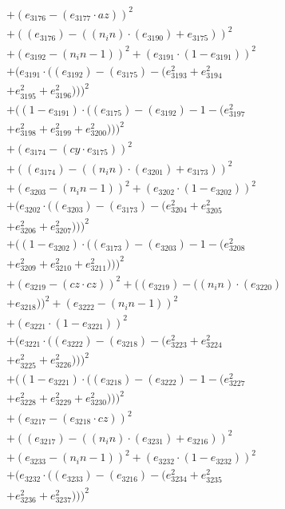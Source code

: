 \documentclass[10pt, a4paper]{article}
\begin{document}
\begin{align*}
& + (e_{3176} - (e_{3177}  \cdot  az))^{2} \\
& + ((e_{3176}) - ((n_in)  \cdot  (e_{3190}) + e_{3175}))^{2} \\
& + (e_{3192} - (n_in - 1))^{2} + (e_{3191}  \cdot  (1 - e_{3191}))^{2} \\
& + (e_{3191}  \cdot  ((e_{3192}) - (e_{3175}) - (e_{3193}^{2} + e_{3194}^{2} \\
& + e_{3195}^{2} + e_{3196}^{2})))^{2} \\
& + ((1 - e_{3191})  \cdot  ((e_{3175}) - (e_{3192}) - 1 - (e_{3197}^{2} \\
& + e_{3198}^{2} + e_{3199}^{2} + e_{3200}^{2})))^{2} \\
& + (e_{3174} - (cy  \cdot  e_{3175}))^{2} \\
& + ((e_{3174}) - ((n_in)  \cdot  (e_{3201}) + e_{3173}))^{2} \\
& + (e_{3203} - (n_in - 1))^{2} + (e_{3202}  \cdot  (1 - e_{3202}))^{2} \\
& + (e_{3202}  \cdot  ((e_{3203}) - (e_{3173}) - (e_{3204}^{2} + e_{3205}^{2} \\
& + e_{3206}^{2} + e_{3207}^{2})))^{2} \\
& + ((1 - e_{3202})  \cdot  ((e_{3173}) - (e_{3203}) - 1 - (e_{3208}^{2} \\
& + e_{3209}^{2} + e_{3210}^{2} + e_{3211}^{2})))^{2} \\
& + (e_{3219} - (cz  \cdot  cz))^{2} + ((e_{3219}) - ((n_in)  \cdot  (e_{3220}) \\
& + e_{3218}))^{2} + (e_{3222} - (n_in - 1))^{2} \\
& + (e_{3221}  \cdot  (1 - e_{3221}))^{2} \\
& + (e_{3221}  \cdot  ((e_{3222}) - (e_{3218}) - (e_{3223}^{2} + e_{3224}^{2} \\
& + e_{3225}^{2} + e_{3226}^{2})))^{2} \\
& + ((1 - e_{3221})  \cdot  ((e_{3218}) - (e_{3222}) - 1 - (e_{3227}^{2} \\
& + e_{3228}^{2} + e_{3229}^{2} + e_{3230}^{2})))^{2} \\
& + (e_{3217} - (e_{3218}  \cdot  cz))^{2} \\
& + ((e_{3217}) - ((n_in)  \cdot  (e_{3231}) + e_{3216}))^{2} \\
& + (e_{3233} - (n_in - 1))^{2} + (e_{3232}  \cdot  (1 - e_{3232}))^{2} \\
& + (e_{3232}  \cdot  ((e_{3233}) - (e_{3216}) - (e_{3234}^{2} + e_{3235}^{2} \\
& + e_{3236}^{2} + e_{3237}^{2})))^{2} \\

\end{align*}
\end{document}
